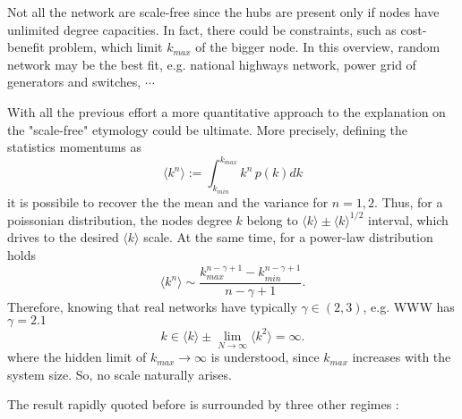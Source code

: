\documentclass[a4paper,10pt,twoside]{book} %
\theoremstyle{definition}
\begin{document}
Not all the network are scale-free since the hubs are present only if nodes have unlimited degree capacities.
In fact, there could be constraints, such as cost-benefit problem, which limit $k_{max}$ of the bigger node. In this overview, random network may be the best fit, e.g. national highways network, power grid of generators and switches, $\cdots$

With all the previous effort a more quantitative approach to the explanation on the "scale-free" etymology could be ultimate.
More precisely, defining the statistics momentums as
\begin{equation}
	\langle k^n \rangle := \int_{k_{min}}^{k_{max}} k^n\, p(k) dk
\end{equation}
it is possibile to recover the the mean and the variance for $n = 1,2$.
Thus, for a poissonian distribution, the nodes degree $k$ belong to $\langle k \rangle \pm  \langle k \rangle ^ {1/2}$ interval, which drives to the desired $\langle k \rangle$ scale. At the same time, for a power-law distribution holds	
\begin{equation}
	\langle k^n \rangle \sim \frac{k_{max}^{n-\gamma+1}-k_{min}^{n-\gamma+1}}{n-\gamma+1}
	.
\end{equation}
Therefore, knowing that real networks have typically $\gamma \in (2,3)$, e.g. WWW has $\gamma =  2.1$ \cite{barabasi::2016networkbook}
\begin{equation}
	k \in \langle k \rangle \pm \lim_{N \to \infty} \langle k^2 \rangle = \infty.
\end{equation}
where the hidden limit of \( k_{max} \to \infty \) is understood, since $k_{max}$ increases with the system size. 
So, no scale naturally arises.

The result rapidly quoted before is surrounded by three other regimes 
\cite{Cohen:2003_SFUSW}:
\end{document}
